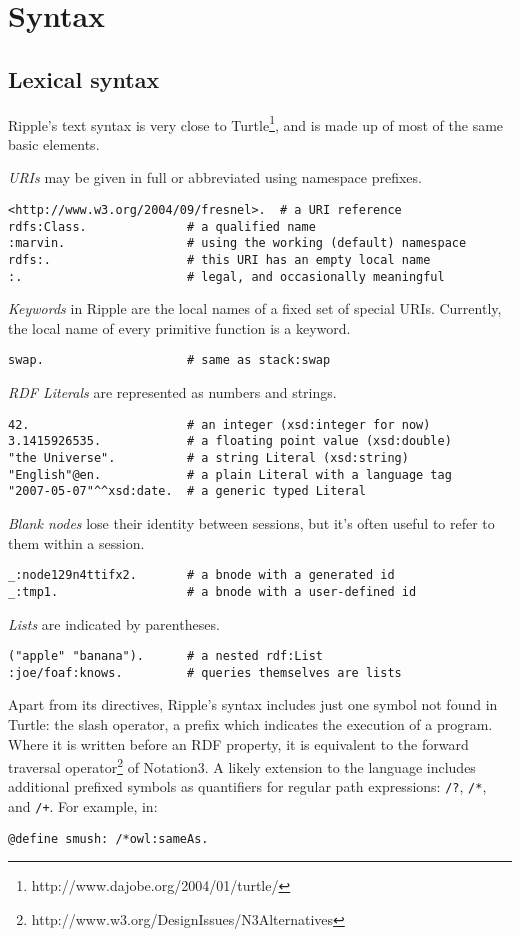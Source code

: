 \documentclass[runningheads]{llncs}
\begin{document}
\section{Syntax}


\subsection{Lexical syntax}

Ripple's text syntax is very close to Turtle\footnote{http://www.dajobe.org/2004/01/turtle/}, and is made up of most
of the same basic elements.

\textit{URIs} may be given in full or abbreviated using namespace prefixes.
\begin{verbatim}
<http://www.w3.org/2004/09/fresnel>.  # a URI reference
rdfs:Class.              # a qualified name
:marvin.                 # using the working (default) namespace
rdfs:.                   # this URI has an empty local name
:.                       # legal, and occasionally meaningful
\end{verbatim}
\textit{Keywords} in Ripple are the local names of a fixed set of special URIs.  Currently, the local name of every primitive function is a keyword.
\begin{verbatim}
swap.                    # same as stack:swap
\end{verbatim}
\textit{RDF Literals} are represented as numbers and strings.
\begin{verbatim}
42.                      # an integer (xsd:integer for now)
3.1415926535.            # a floating point value (xsd:double)
"the Universe".          # a string Literal (xsd:string)
"English"@en.            # a plain Literal with a language tag
"2007-05-07"^^xsd:date.  # a generic typed Literal
\end{verbatim}
\textit{Blank nodes} lose their identity between sessions, but it's often useful to refer to them within a session.
\begin{verbatim}
_:node129n4ttifx2.       # a bnode with a generated id
_:tmp1.                  # a bnode with a user-defined id
\end{verbatim}
\textit{Lists} are indicated by parentheses.
\begin{verbatim}
("apple" "banana").      # a nested rdf:List
:joe/foaf:knows.         # queries themselves are lists
\end{verbatim}
Apart from its directives, Ripple's syntax includes just one symbol not found in Turtle: the slash operator, a prefix which indicates the execution of a program.  Where it is written before an RDF property, it is equivalent to the forward traversal operator\footnote{http://www.w3.org/DesignIssues/N3Alternatives} of Notation3.  A likely extension to the language includes additional prefixed symbols as quantifiers for regular path expressions: \texttt{/?}, \texttt{/*}, and \texttt{/+}.  For example, in:
\begin{verbatim}
@define smush: /*owl:sameAs.
\end{verbatim}
\end{document}
